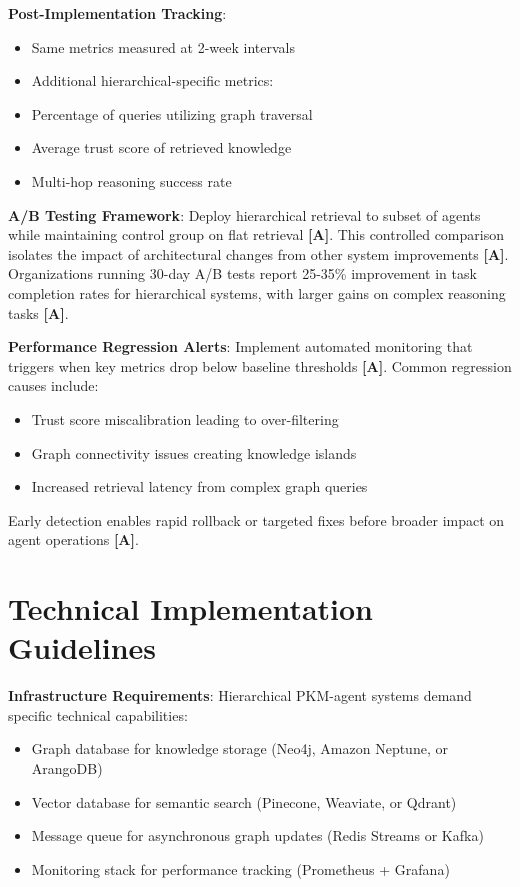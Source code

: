 \documentclass[a4paper,11pt]{article}
\newcommand{\alabel}{\textbf{\textcolor{acolor}{[A]}}}
\begin{document}
\textbf{Post-Implementation Tracking}:

\begin{itemize}
  \item Same metrics measured at 2-week intervals
  \item Additional hierarchical-specific metrics:
  \item Percentage of queries utilizing graph traversal
  \item Average trust score of retrieved knowledge
  \item Multi-hop reasoning success rate
\end{itemize}

\textbf{A/B Testing Framework}: Deploy hierarchical retrieval to subset of agents while maintaining control group on flat retrieval \alabel{}. This controlled comparison isolates the impact of architectural changes from other system improvements \alabel{}. Organizations running 30-day A/B tests report 25-35\% improvement in task completion rates for hierarchical systems, with larger gains on complex reasoning tasks \alabel{}.


\textbf{Performance Regression Alerts}: Implement automated monitoring that triggers when key metrics drop below baseline thresholds \alabel{}. Common regression causes include:

\begin{itemize}
  \item Trust score miscalibration leading to over-filtering
  \item Graph connectivity issues creating knowledge islands
  \item Increased retrieval latency from complex graph queries
\end{itemize}

Early detection enables rapid rollback or targeted fixes before broader impact on agent operations \alabel{}.


\section{Technical Implementation Guidelines}

\textbf{Infrastructure Requirements}: Hierarchical PKM-agent systems demand specific technical capabilities:


\begin{itemize}
  \item Graph database for knowledge storage (Neo4j, Amazon Neptune, or ArangoDB)
  \item Vector database for semantic search (Pinecone, Weaviate, or Qdrant)
  \item Message queue for asynchronous graph updates (Redis Streams or Kafka)
  \item Monitoring stack for performance tracking (Prometheus + Grafana)
\end{itemize}
\end{document}
